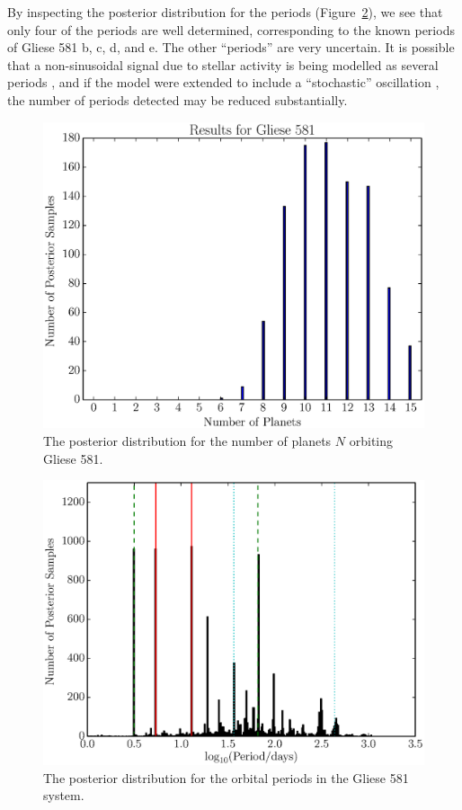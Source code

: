 \documentclass[useAMS,usenatbib]{mn2e}
\begin{document}
By inspecting the posterior distribution for the periods
(Figure~\ref{fig:gliese581_periods}), we see that only four of the periods
are well determined, corresponding to the known periods of Gliese 581 b, c, d,
and e. The other ``periods'' are very uncertain. It is possible that a
non-sinusoidal signal due to stellar activity is being modelled as several
periods \citep{astero}, and if the model were extended to include a ``stochastic''
oscillation \citep{gaussproc}, the number of periods detected may be reduced
substantially.

\begin{figure}
\includegraphics[scale=0.45]{Figures/gliese581_N.eps}
\caption{The posterior distribution for the number of planets $N$ orbiting
Gliese 581.\label{fig:gliese581_N}}
\end{figure}

\begin{figure}
\includegraphics[scale=0.45]{Figures/gliese581_periods.eps}
\caption{The posterior distribution for the orbital periods in the Gliese 581
system.\label{fig:gliese581_periods}}
\end{figure}
\end{document}
